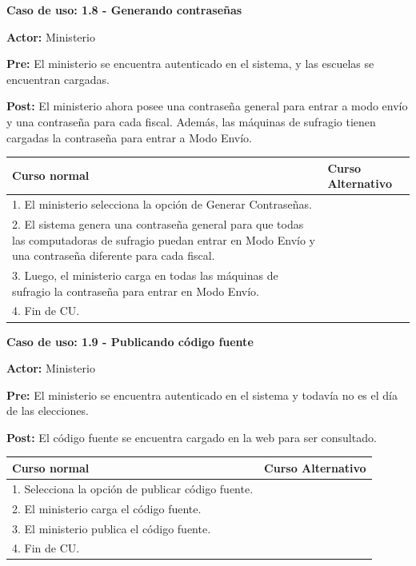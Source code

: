 \textbf{Caso de uso: 1.8 - Generando contraseñas}

\textbf{Actor:} Ministerio

\textbf{Pre:} El ministerio se encuentra autenticado en el sistema, y las escuelas se encuentran cargadas.

\textbf{Post:} El ministerio ahora posee una contraseña general para entrar a modo envío y una contraseña para cada fiscal. Además, las máquinas de sufragio tienen cargadas la contraseña para entrar a Modo Envío.

\begin{table}[h!]
	
 \begin{tabular}{|p{7.5cm} | p{7.5cm}|} 
 \hline
 \textbf{Curso normal} & \textbf{Curso Alternativo} \\
 \hline

1. El ministerio selecciona la opción de Generar Contraseñas. & \\
\hline

2. El sistema genera una contraseña general para que todas las computadoras de sufragio puedan entrar en Modo Envío y una contraseña diferente para cada fiscal. & \\
\hline

3. Luego, el ministerio carga en todas las máquinas de sufragio la contraseña para entrar en Modo Envío. & \\
\hline

4. Fin de CU. & \\
\hline

\end{tabular}
\end{table}
\textbf{Caso de uso: 1.9 - Publicando código fuente}

\textbf{Actor:} Ministerio

\textbf{Pre:} El ministerio se encuentra autenticado en el sistema y todavía no es el día de las elecciones.

\textbf{Post:} El código fuente se encuentra cargado en la web para ser consultado. 

\begin{table}[h!]
	
 \begin{tabular}{|p{7.5cm} | p{7.5cm}|} 
 \hline
 \textbf{Curso normal} & \textbf{Curso Alternativo} \\
 \hline
 
1. Selecciona la opción de publicar código fuente. & \\
\hline

2. El ministerio carga el código fuente. & \\
\hline

3. El ministerio publica el código fuente. & \\
\hline

4. Fin de CU. & \\
\hline
\end{tabular}
\end{table}

